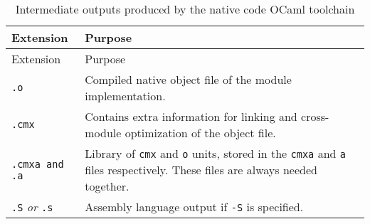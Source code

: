 \hypertarget{Table2302}{}
\begin{longtable}[]{@{}ll@{}}
\caption{Intermediate outputs produced by the native code OCaml
toolchain}\tabularnewline
\toprule
\begin{minipage}[b]{0.52\columnwidth}\raggedright
Extension\strut
\end{minipage} & \begin{minipage}[b]{0.42\columnwidth}\raggedright
Purpose\strut
\end{minipage}\tabularnewline
\midrule
\endfirsthead
\toprule
\begin{minipage}[b]{0.52\columnwidth}\raggedright
Extension\strut
\end{minipage} & \begin{minipage}[b]{0.42\columnwidth}\raggedright
Purpose\strut
\end{minipage}\tabularnewline
\midrule
\endhead
\begin{minipage}[t]{0.52\columnwidth}\raggedright
\passthrough{\lstinline!.o!}\strut
\end{minipage} & \begin{minipage}[t]{0.42\columnwidth}\raggedright
Compiled native object file of the module implementation.\strut
\end{minipage}\tabularnewline
\begin{minipage}[t]{0.52\columnwidth}\raggedright
\passthrough{\lstinline!.cmx!}\strut
\end{minipage} & \begin{minipage}[t]{0.42\columnwidth}\raggedright
Contains extra information for linking and cross-module optimization of
the object file.\strut
\end{minipage}\tabularnewline
\begin{minipage}[t]{0.52\columnwidth}\raggedright
\passthrough{\lstinline!.cmxa and .a!}\strut
\end{minipage} & \begin{minipage}[t]{0.42\columnwidth}\raggedright
Library of \passthrough{\lstinline!cmx!} and \passthrough{\lstinline!o!}
units, stored in the \passthrough{\lstinline!cmxa!} and
\passthrough{\lstinline!a!} files respectively. These files are always
needed together.\strut
\end{minipage}\tabularnewline
\begin{minipage}[t]{0.52\columnwidth}\raggedright
\passthrough{\lstinline!.S!} \emph{or}
\passthrough{\lstinline!.s!}\strut
\end{minipage} & \begin{minipage}[t]{0.42\columnwidth}\raggedright
Assembly language output if \passthrough{\lstinline!-S!} is
specified.\strut
\end{minipage}\tabularnewline
\bottomrule
\end{longtable}
